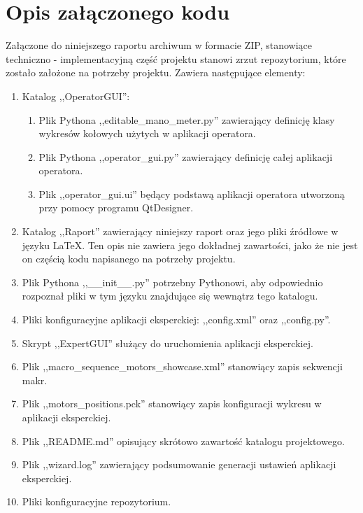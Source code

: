 \clearpage
\section{Opis załączonego kodu}
\label{sec:opis_kodu}

\quad Załączone do niniejszego raportu archiwum w formacie ZIP, stanowiące techniczno - implementacyjną część projektu stanowi zrzut repozytorium, które zostało założone na potrzeby projektu. Zawiera następujące elementy:
\begin{enumerate}
	\item Katalog ,,OperatorGUI'':
	\begin{enumerate}
		\item Plik Pythona ,,editable\_mano\_meter.py'' zawierający definicję klasy wykresów kołowych użytych w aplikacji operatora.
		\item Plik Pythona ,,operator\_gui.py'' zawierający definicję całej aplikacji operatora.
		\item Plik ,,operator\_gui.ui'' będący podstawą aplikacji operatora utworzoną przy pomocy programu QtDesigner.
	\end{enumerate}
	\item Katalog ,,Raport'' zawierający niniejszy raport oraz jego pliki źródłowe w języku LaTeX. Ten opis nie zawiera jego dokładnej zawartości, jako że nie jest on częścią kodu napisanego na potrzeby projektu.
	\item Plik Pythona ,,\_\_init\_\_.py'' potrzebny Pythonowi, aby odpowiednio rozpoznał pliki w tym języku znajdujące się wewnątrz tego katalogu.
	\item Pliki konfiguracyjne aplikacji eksperckiej: ,,config.xml'' oraz ,,config.py''.
	\item Skrypt ,,ExpertGUI'' służący do uruchomienia aplikacji eksperckiej.
	\item Plik ,,macro\_sequence\_motors\_showcase.xml'' stanowiący zapis sekwencji makr.
	\item Plik ,,motors\_positions.pck'' stanowiący zapis konfiguracji wykresu w aplikacji eksperckiej.
	\item Plik ,,README.md'' opisujący skrótowo zawartość katalogu projektowego.
	\item Plik ,,wizard.log'' zawierający podsumowanie generacji ustawień aplikacji eksperckiej.
	\item Pliki konfiguracyjne repozytorium.
\end{enumerate}
